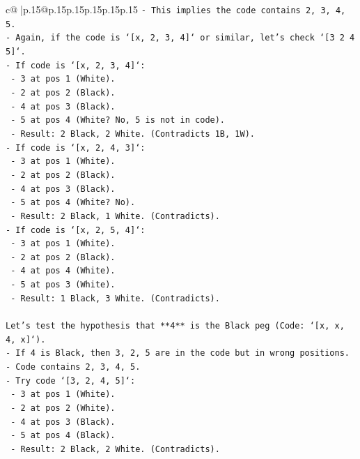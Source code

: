 \documentclass{article}
\begin{document}
{\begin{supertabular}{c@{$\;$}|p{.15\linewidth}@{}p{.15\linewidth}p{.15\linewidth}p{.15\linewidth}p{.15\linewidth}p{.15\linewidth}}
{{{\texttt{{-} This implies the code contains 2, 3, 4, 5.} \\
\texttt{{-} Again, if the code is `{[}x, 2, 3, 4{]}` or similar, let's check `{[}3 2 4 5{]}`.} \\
\texttt{{-} If code is `{[}x, 2, 3, 4{]}`:} \\
\texttt{  {-} 3 at pos 1 (White).} \\
\texttt{  {-} 2 at pos 2 (Black).} \\
\texttt{  {-} 4 at pos 3 (Black).} \\
\texttt{  {-} 5 at pos 4 (White? No, 5 is not in code).} \\
\texttt{  {-} Result: 2 Black, 2 White. (Contradicts 1B, 1W).} \\
\texttt{{-} If code is `{[}x, 2, 4, 3{]}`:} \\
\texttt{  {-} 3 at pos 1 (White).} \\
\texttt{  {-} 2 at pos 2 (Black).} \\
\texttt{  {-} 4 at pos 3 (Black).} \\
\texttt{  {-} 5 at pos 4 (White? No).} \\
\texttt{  {-} Result: 2 Black, 1 White. (Contradicts).} \\
\texttt{{-} If code is `{[}x, 2, 5, 4{]}`:} \\
\texttt{  {-} 3 at pos 1 (White).} \\
\texttt{  {-} 2 at pos 2 (Black).} \\
\texttt{  {-} 4 at pos 4 (White).} \\
\texttt{  {-} 5 at pos 3 (White).} \\
\texttt{  {-} Result: 1 Black, 3 White. (Contradicts).} \\
\\ 
\texttt{Let's test the hypothesis that **4** is the Black peg (Code: `{[}x, x, 4, x{]}`).} \\
\texttt{{-} If 4 is Black, then 3, 2, 5 are in the code but in wrong positions.} \\
\texttt{{-} Code contains 2, 3, 4, 5.} \\
\texttt{{-} Try code `{[}3, 2, 4, 5{]}`:} \\
\texttt{  {-} 3 at pos 1 (White).} \\
\texttt{  {-} 2 at pos 2 (White).} \\
\texttt{  {-} 4 at pos 3 (Black).} \\
\texttt{  {-} 5 at pos 4 (Black).} \\
\texttt{  {-} Result: 2 Black, 2 White. (Contradicts).} \\
}}}
\end{supertabular}}
\end{document}
